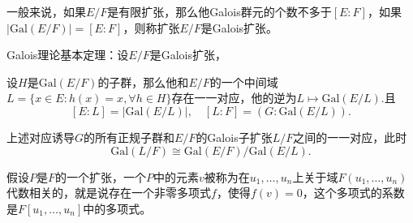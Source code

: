 一般来说，如果$E/F$是有限扩张，那么他Galois群元的个数不多于$[E:F]$，如果$|\mathrm{Gal}(E/F)|=[E:F]$，则称扩张$E/F$是Galois扩张。

\theo Galois理论基本定理：设$E/F$是Galois扩张，

 设$H$是$\mathrm{Gal}(E/F)$的子群，那么他和$E/F$的一个中间域$L=\{x\in E:h(x)=x,\forall h\in H\}$存在一一对应，他的逆为$L\mapsto \mathrm{Gal}(E/L)$.且
\[
[E:L]=|\mathrm{Gal}(E/L)|,\quad [L:F]=(G:\mathrm{Gal}(E/L)).
\]

 上述对应诱导$G$的所有正规子群和$E/F$的Galois子扩张$L/F$之间的一一对应，此时
\[
	\mathrm{Gal}(L/F)\cong \mathrm{Gal}(E/F)/\mathrm{Gal}(E/L).
\]

\para 假设$P$是$F$的一个扩张，一个$P$中的元素$v$被称为在$u_1,\dots ,u_n$上关于域$F(u_1,\dots ,u_n)$代数相关的，就是说存在一个非零多项式$f$，使得$f(v)=0$，这个多项式的系数是$F[u_1,\dots ,u_n]$中的多项式。